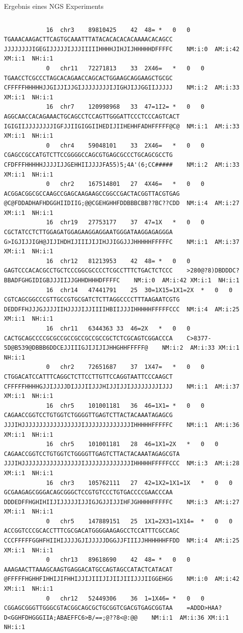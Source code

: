 \documentclass[10pt]{beamer}
\begin{document}
\begin{frame}[fragile]{Ergebnis eines NGS Experiments}
\begin{columns}
\begin{lstlisting}
			16	chr3	89810425	42	48=	*	0	0	TGAAACAAGACTTCAGTGCAAATTTATACACACACACAAAACACAGCC	JJJJJJJJIGEGIJJJJJIJJJIIIIIHHHHJIHJIJHHHHHDFFFFC	NM:i:0	AM:i:42	XM:i:1	NH:i:1
			0	chr11	72271813	33	2X46=	*	0	0	TGAACCTCGCCCTAGCACAGAACCAGCACTGGAAGCAGGAAGCTGCGC	CFFFFFHHHHHJJGIJJIJJGIJJJJJJJJIJIGHJIJJGGIIJJJJJ	NM:i:2	AM:i:33	XM:i:1	NH:i:1
			16	chr7	120998968	33	47=1I2=	*	0	0	AGGCAACCACAGAAACTGCAGCCTCCAGTTGGGATTCCCTCCCAGTCACT	IGIGIIJJJJJJJJIGFJJIIGIGGIIHEDIJIIHEHHFADHFFFFF@C@	NM:i:1	AM:i:33	XM:i:1	NH:i:1
			0	chr4	59048101	33	2X46=	*	0	0	CGAGCCGCCATGTCTTCCGGGGCCAGCGTGAGCGCCCTGCAGCGCCTG	CFDFFFHHHHHJJJJIJJGEHHIIJJJJFA55)5;4A'(6;CC#####	NM:i:2	AM:i:33	XM:i:1	NH:i:1
			0	chr2	167514801	27	4X46=	*	0	0	ACGGACGGCGCCAAGCCGAGCAAGAAGCCGGCCGACTACGGTTACGTGAG	@C@FDDADHAFHDGGHIIDIIG;@@CGEHGHHFDDBBBCBB??BC??CDD	NM:i:4	AM:i:27	XM:i:1	NH:i:1
			16	chr19	27753177	37	47=1X	*	0	0	CGCTATCCTCTTGGAGATGGAGAAGGAGGAATGGGATAAGGAGAGGGA	G>IGJIJJIGH@JIJIHDHIJIIIJIJIHJJIGGJJJHHHHHFFFFFC	NM:i:1	AM:i:37	XM:i:1	NH:i:1
			16	chr12	81213953	42	48=	*	0	0	GAGTCCCACACGCCTGCTCCCGGCGCCCCTCGCCTTTCTGACTCTCCC	>280@?8)DBDDDC?BBADFGHGIDIGBJJJIIJJGHHDHHHDFFFFC	NM:i:0	AM:i:42	XM:i:1	NH:i:1
			16	chr14	47441791	25	30=1X15=1X1=2X	*	0	0	CGTCAGCGGCCCGTTGCCGTGCGATCTCTTAGGCCCCTTTAAGAATCGTG	DEDDFFHJJJGJJJJIIHJJJJIJJIIIIHBIIJJJIHHHHHFFFFFCCC	NM:i:4	AM:i:25	XM:i:1	NH:i:1
			16	chr11	6344363	33	46=2X	*	0	0	CACTGCAGCCCCGCGCCGCCGCCGCCGCCGCTCTCGCAGTCGGACCCA	C>8377-5D@B539@DBBB6DDCEJJIIIGJIJIJIJHHGHHFFFFF@	NM:i:2	AM:i:33	XM:i:1	NH:i:1
			0	chr2	72651687	37	1X47=	*	0	0	CTGGACATCCATTTCAGGCTCTTCCTTGTTCCAGGTAATTCCCAAGCT	CFFFFFHHHHGJJIJJJJDIJJJIIJJJHIJJIJJIJJJJJJJJIJJJ	NM:i:1	AM:i:37	XM:i:1	NH:i:1
			16	chr5	101001181	36	46=1X1=	*	0	0	CAGAACCGGTCCTGTGGTCTGGGGTTGAGTCTTACTACAAATAGAGCG	JJJIHJJJJJJJJJJJJJJJJJIJJJJJJJJJJJJJIHHHHHFFFFFC	NM:i:1	AM:i:36	XM:i:1	NH:i:1
			16	chr5	101001181	28	46=1X1=2X	*	0	0	CAGAACCGGTCCTGTGGTCTGGGGTTGAGTCTTACTACAAATAGAGCGTA	JJJIHJJJJJJJJJJJJJJJJJIJJJJJJJJJJJJJIHHHHHFFFFFCCC	NM:i:3	AM:i:28	XM:i:1	NH:i:1
			16	chr3	105762111	27	42=1X2=1X1=1X	*	0	0	GCGAAGAGCGGGACAGCGGGCTCCGTGTCCCTGTGACCCCGAACCCAA	DDDEDFFHGHIHIIJIJJJJJIJJIGJGJJIJJIHFJGHHHHFFFFFC	NM:i:3	AM:i:27	XM:i:1	NH:i:1
			0	chr5	147889151	25	1X1=2X31=1X14=	*	0	0	ACCGGTCCCGCACCTTTCGCGACATGGGGAAGAGCCTCCATTTCGCCAGC	CCCFFFFFGGHFHIIHIJJJJGJIJJJJJDGGJJFIIIJJHHHHHHFFDD	NM:i:4	AM:i:25	XM:i:1	NH:i:1
			0	chr13	89618690	42	48=	*	0	0	AAAGAACTTAAAGCAAGTGAGGACATGCCAGTAGCCATACTCATACAT	@FFFFFHGHHFIHHIJIFHHIJJIJIIIJIJIIJIIIJJJIIGGEHGG	NM:i:0	AM:i:42	XM:i:1	NH:i:1
			0	chr12	52449306	36	1=1X46=	*	0	0	CGGAGCGGGTTGGGCGTACGGCAGCGCTGCGGTCGACGTGAGCGGTAA	=ADDD>HAA?D<GGHFDHGGGIIA;ABAEFFC6>B/==;@??8<@:@@	NM:i:1	AM:i:36	XM:i:1	NH:i:1

\end{lstlisting}
\end{columns}
\end{frame}
\end{document}
